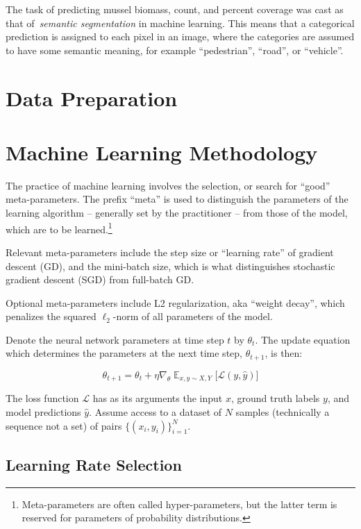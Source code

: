 \documentclass[11pt]{article} %
\begin{document}
The task of predicting mussel biomass, count, and percent coverage was cast as
that of~\emph{semantic segmentation} in machine learning. This means that a 
categorical prediction is assigned to each pixel in an image, where the
categories are assumed to have some semantic meaning, for example 
``pedestrian'', ``road'', or ``vehicle''.

\section{Data Preparation}

\section{Machine Learning Methodology}

The practice of machine learning involves the selection, or search for ``good'' 
meta-parameters. The prefix ``meta'' is used to distinguish the parameters of
the learning algorithm -- generally set by the practitioner -- from those of the
model, which are to be learned.\footnote{Meta-parameters are often called
hyper-parameters, but the latter term is reserved for parameters of 
probability distributions.}

Relevant meta-parameters include the step size or ``learning rate'' of gradient
descent (GD), and the mini-batch size, which is what distinguishes stochastic
gradient descent (SGD) from full-batch GD. 

Optional meta-parameters include L2 regularization, aka ``weight decay'',
which penalizes the squared $\ell_2$-norm of all parameters of the model.

Denote the neural network parameters at time step $t$ by $\theta_t$. The update
equation which determines the parameters at the next time step, $\theta_{t + 
1}$, is then:

\begin{equation} \label{eq:sgd}
\theta_{t + 1} = \theta_t + \eta \nabla_{\theta} \mathop{\mathbb{E}}_{x,y \sim 
X, Y} \big[ \mathcal{L}(y, \hat{y}) \big]
\end{equation}

The loss function $\mathcal{L}$ has as its arguments the input $x$, ground
truth labels $y$, and model predictions $\hat{y}$. Assume access to a dataset 
of $N$ samples (technically a sequence not a set) of pairs 
$\{ (x_i, y_i)\}_{i=1}^{N} $.

\subsection{Learning Rate Selection}
\end{document}
